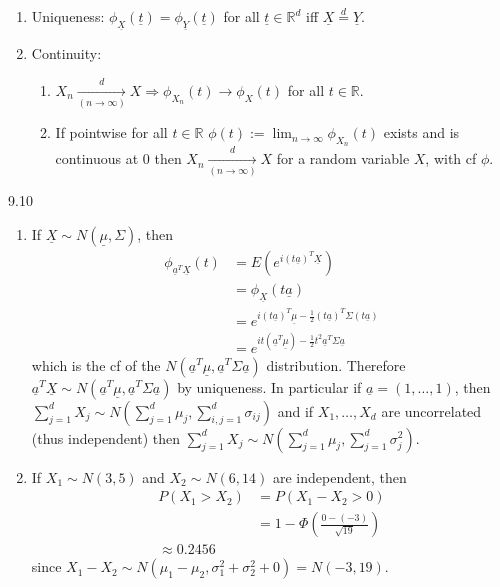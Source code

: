 \documentclass{article}
\newcommand{\R}{\mathbb{R}}
\begin{document}
			\begin{mythm}{}{}
				\begin{enumerate}
					\item Uniqueness: $\phi_{\underline{X}}(\underline{t})=\phi_{\underline{Y}}(\underline{t})$ for all $\underline{t}\in\R^d$ iff $\underline{X}\stackrel{d}{=}\underline{Y}$.
					
					\item Continuity:
					\begin{enumerate}[label=(\roman*)]
						\item $X_n\underset{(n\to\infty)}{\overset{d}{\to}}X\Rightarrow\phi_{X_n}(t)\to\phi_X(t)$ for all $t\in\R$.
						
						\item If pointwise for all $t\in\R$ $\phi(t):=\lim_{n\to\infty}\phi_{X_n}(t)$ exists and is continuous at 0 then $X_n\underset{(n\to\infty)}{\overset{d}{\to}}X$ for a random variable $X$, with cf $\phi$.
					\end{enumerate}
				\end{enumerate}
			\end{mythm}
			
			\begin{myex}{}{9.10}
				\begin{enumerate}
					\item If $\underline{X}\sim N(\underline{\mu}, \Sigma)$, then
					\begin{align*}
						\phi_{\underline{a}^T\underline{X}}(t)&=E(e^{i(t\underline{a})^T\underline{X}})\\
						&=\phi_{\underline{X}}(t\underline{a})\\
						&=e^{i(t\underline{a})^T\underline{\mu}-\frac{1}{2}(t\underline{a})^T\Sigma(t\underline{a})}\\
						&=e^{it(\underline{a}^T\underline{\mu})-\frac{1}{2}t^2\underline{a}^T\Sigma\underline{a}}
					\end{align*}		
					which is the cf of the $N(\underline{a}^T\underline{\mu}, \underline{a}^T\Sigma\underline{a})$ distribution. Therefore $\underline{a}^T\underline{X}\sim N(\underline{a}^T\underline{\mu}, \underline{a}^T\Sigma\underline{a})$ by uniqueness. In particular if $\underline{a}=(1, \dots, 1)$, then $\sum_{j=1}^dX_j\sim N(\sum_{j=1}^d\mu_j, \sum_{i, j=1}^d\sigma_{ij})$ and if $X_1, \dots, X_d$ are uncorrelated (thus independent) then $\sum_{j=1}^dX_j\sim N(\sum_{j=1}^d\mu_j, \sum_{j=1}^d\sigma_j^2)$.
					
					\item If $X_1\sim N(3, 5)$ and $X_2\sim N(6, 14)$ are independent, then
					\begin{align*}
						P(X_1>X_2)&=P(X_1-X_2>0)\\
						&=1-\Phi(\frac{0-(-3)}{\sqrt{19}})\\
						\approx0.2456
					\end{align*}	
					since $X_1-X_2\sim N(\mu_1-\mu_2, \sigma_1^2+\sigma_2^2+0)=N(-3, 19)$.				
				\end{enumerate}
			\end{myex}
			
\end{document}
